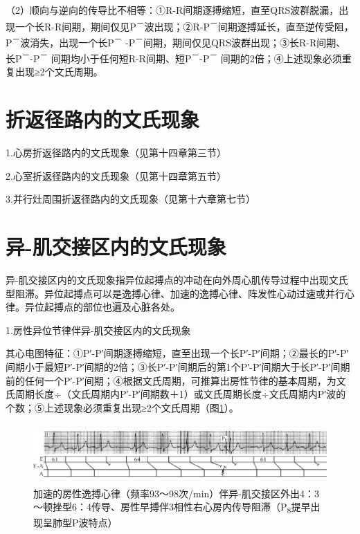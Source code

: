 （2）顺向与逆向的传导比不相等：①R-R间期逐搏缩短，直至QRS波群脱漏，出现一个长R-R间期，期间仅见P\textsuperscript{－}波出现；②R-P\textsuperscript{－}间期逐搏延长，直至逆传受阻，P\textsuperscript{－}波消失，出现一个长P\textsuperscript{－} -P\textsuperscript{－}间期，期间仅见QRS波群出现；③长R-R间期、长P\textsuperscript{－}-P\textsuperscript{－} 间期均小于任何短R-R间期、短P\textsuperscript{－}-P\textsuperscript{－} 间期的2倍；④上述现象必须重复出现≥2个文氏周期。

\protect\hypertarget{text00025.htmlux5cux23subid311}{}{}

\section{折返径路内的文氏现象}

1.心房折返径路内的文氏现象（见第十四章第三节）

2.心室折返径路内的文氏现象（见第十四章第五节）

3.并行灶周围折返径路内的文氏现象（见第十六章第七节）

\protect\hypertarget{text00025.htmlux5cux23subid312}{}{}

\section{异-肌交接区内的文氏现象}

异-肌交接区内的文氏现象指异位起搏点的冲动在向外周心肌传导过程中出现文氏型阻滞。异位起搏点可以是逸搏心律、加速的逸搏心律、阵发性心动过速或并行心律。异位起搏点的部位也遍及心脏各处。

1.房性异位节律伴异-肌交接区内的文氏现象

其心电图特征：①P′-P′间期逐搏缩短，直至出现一个长P′-P′间期；②最长的P′-P′间期小于最短P′-P′间期的2倍；③长P′-P′间期后的第1个P′-P′间期大于长P′-P′间期前的任何一个P′-P′间期；④根据文氏周期，可推算出房性节律的基本周期，为文氏周期长度÷（文氏周期内P′-P′间期数＋1）或文氏周期长度÷文氏周期内P′波的个数；⑤上述现象必须重复出现≥2个文氏周期（图\ref{fig18-14}）。

\begin{figure}[!htbp]
 \centering
 \includegraphics[width=5.80208in,height=0.89583in]{./images/Image00315.jpg}
 \captionsetup{justification=centering}
 \caption{加速的房性逸搏心律（频率93～98次/min）伴异-肌交接区外出4：3～顿挫型6：4传导、房性早搏伴3相性右心房内传导阻滞（P\textsubscript{8}提早出现呈肺型P波特点）}
 \label{fig18-14}
  \end{figure} 


